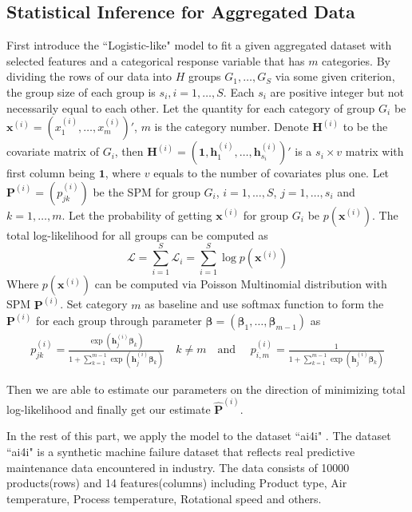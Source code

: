 \documentclass[12pt]{article}
\newcommand{\loglik}{\mathcal{L}}
\newcommand{\onevec}{{\boldsymbol{1}}}
\newcommand{\betavec}{{\boldsymbol{\beta}}}
\newcommand{\Pmat}{\mathbf{P}}
\newcommand{\Hmat}{\mathbf{H}}
\newcommand{\wh}{\widehat}
\newcommand{\xvec}{\boldsymbol{x}}
\newcommand{\hvec}{\boldsymbol{h}}
\begin{document}
\subsection{Statistical Inference for Aggregated Data}\label{sec:model.est.inf}	
First introduce the ``Logistic-like" model to fit a given aggregated dataset with selected features and a categorical response variable that has $m$ categories.
By dividing the rows of our data into $H$ groups $G_1,\dots,G_{S}$ via some given criterion, the group size of each group is $s_i,i=1,\dots,S$. Each $s_i$ are positive integer but not necessarily equal to each other. Let the quantity for each category of group $G_i$ be $\xvec^{(i)} = (x_1^{(i)}, \dots, x_m^{(i)})'$, $m$ is the category number. Denote $\Hmat^{(i)}$ to be the covariate matrix of $G_i$, then $\Hmat^{(i)} = (\onevec, \hvec_{1}^{(i)},\dots,\hvec_{s_i}^{(i)})'$ is a $s_i \times v$ matrix with first column being $\onevec$, where $v$ equals to the number of covariates plus one. Let $\Pmat^{(i)} = (p_{jk}^{(i)})$ be the SPM for group $G_i$, $i = 1, \dots, S$, $j = 1,\dots ,s_i$ and $k = 1,\dots, m$. Let the probability of getting $\xvec^{(i)}$ for group $G_i$ be $p(\xvec^{(i)})$. The total log-likelihood for all groups can be computed as
\begin{equation*}
\loglik = \sum_{i=1}^{S}\loglik_i = \sum_{i=1}^{S}\log p(\xvec^{(i)})
\end{equation*}
Where $p(\xvec^{(i)})$ can be computed via Poisson Multinomial distribution with SPM $\Pmat^{(i)}$. Set category $m$ as baseline and use softmax function to form the $\Pmat^{(i)}$ for each group through parameter $\betavec = (\betavec_1, \dots, \betavec_{m-1})$ as
\begin{align*}
    p_{j k}^{(i)} = \frac{\exp{\left(\hvec_{j}^{(i)} \betavec_{k}\right)}}{1 + \sum_{k=1}^{m-1}\exp{\left( \hvec_{j}^{(i)} \betavec_{k} \right)}}
    \quad k \neq m \quad \text{and } \quad
    p_{i,m}^{(i)} = \frac{1}{1 + \sum_{k=1}^{m-1}\exp{\left( \hvec_{j}^{(i)} \betavec_{k} \right)}}
\end{align*}

Then we are able to estimate our parameters on the direction of minimizing total log-likelihood and finally get our estimate $\wh{\Pmat}^{(i)}$.

In the rest of this part, we apply the model to the dataset ``ai4i" \cite{Dua:2019}. The dataset ``ai4i" is a synthetic machine failure dataset that reflects real predictive maintenance data encountered in industry. The data consists of 10000 products(rows) and 14 features(columns) including Product type, Air temperature, Process temperature, Rotational speed and others.
\end{document}
